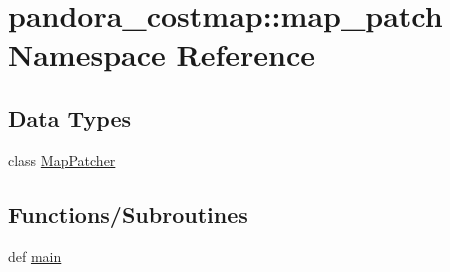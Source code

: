 \hypertarget{namespacepandora__costmap_1_1map__patch}{\section{pandora\-\_\-costmap\-:\-:map\-\_\-patch \-Namespace \-Reference}
\label{namespacepandora__costmap_1_1map__patch}
}
\subsection*{\-Data \-Types}
\begin{DoxyCompactItemize}
\item 
class \hyperlink{classpandora__costmap_1_1map__patch_1_1_map_patcher}{\-Map\-Patcher}
\end{DoxyCompactItemize}
\subsection*{\-Functions/\-Subroutines}
\begin{DoxyCompactItemize}
\item 
def \hyperlink{namespacepandora__costmap_1_1map__patch_a13cf4f189eb049d99dd4c4f7a1e1bf75}{main}
\end{DoxyCompactItemize}
